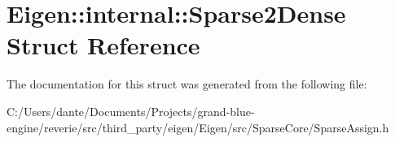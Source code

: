 \hypertarget{struct_eigen_1_1internal_1_1_sparse2_dense}{}\section{Eigen\+::internal\+::Sparse2\+Dense Struct Reference}
\label{struct_eigen_1_1internal_1_1_sparse2_dense}


The documentation for this struct was generated from the following file\+:\begin{DoxyCompactItemize}
\item 
C\+:/\+Users/dante/\+Documents/\+Projects/grand-\/blue-\/engine/reverie/src/third\+\_\+party/eigen/\+Eigen/src/\+Sparse\+Core/Sparse\+Assign.\+h\end{DoxyCompactItemize}
